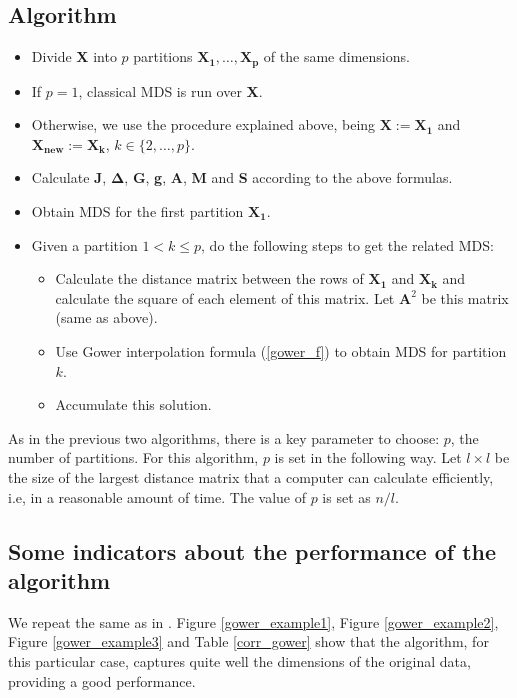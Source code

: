 \documentclass[11pt]{report}
\begin{document}
\subsection{Algorithm}

\begin{itemize}
\item Divide \textbf{X} into $p$ partitions $\mathbf{X_1},\dots, \mathbf{X_p}$
of the same dimensions.

\item If $p=1$, classical MDS is run over \textbf{X}.

\item Otherwise, we use the procedure explained above, 
being $\mathbf{X} := \mathbf{X_1}$ and 
$\mathbf{X_{new}} := \mathbf{X_k}$, $k \in \{2, \dots, p\}$.

\item Calculate \textbf{J}, $\mathbf{\Delta}$, \textbf{G}, \textbf{g},
\textbf{A}, \textbf{M} and \textbf{S} according to the above formulas.

\item Obtain MDS for the first partition $\mathbf{X_1}$. 

\item Given a partition $1 < k \leq p$, do the following steps to get the 
related MDS:

\begin{itemize}

\item Calculate the distance matrix between the rows of $\mathbf{X_1}$ and
$\mathbf{X_k}$ and calculate the square of each element of this matrix. Let
$\mathbf{A}^2$ be this matrix (same as above).

\item Use Gower interpolation formula (\ref{gower_f}) to obtain MDS for 
partition $k$. 

\item Accumulate this solution.


\end{itemize}

\end{itemize}


As in the previous two algorithms, there is a key parameter to choose: $p$,
the number of partitions. For this algorithm, $p$ is set in the following way.
Let $l \times l$ be the size of the largest distance matrix that a computer can 
calculate efficiently, i.e, in a reasonable amount of time. The value of 
$p$ is set as $n/l$.


\subsection{Some indicators about the performance of the algorithm}
We repeat the same as in . Figure \ref{gower_example1},
Figure \ref{gower_example2}, Figure \ref{gower_example3} and 
Table \ref{corr_gower} show that the algorithm, for this particular case, 
captures quite well the dimensions of the original data, providing a 
good performance.
\end{document}

